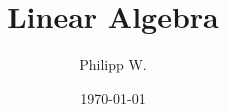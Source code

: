 \documentclass{article}
\begin{document}
\title{Linear Algebra}
\author{Philipp W.}
\date{\today}
\maketitle
\tableofcontents
\clearpage


\clearpage

\clearpage

\clearpage

\clearpage

\clearpage

\clearpage

\clearpage

\clearpage

\clearpage

\clearpage
\
\end{document}
